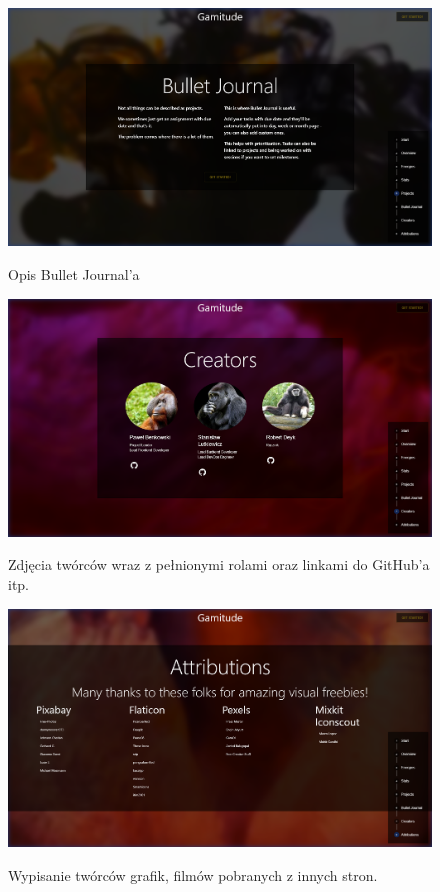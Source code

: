 \documentclass[a4paper,11pt]{report}
\begin{document}
\begin{figure}[H]
	\centering
	\includegraphics[scale=0.3]{prezentacja/Homepage_Bullet}\\
	\caption{Opis Bullet Journal'a}
	\label{fig:homepage_bullet}
\end{figure}
\begin{figure}[H]
	\centering
	\includegraphics[scale=0.3]{prezentacja/Homepage_Creators}\\
	\caption{Zdjęcia twórców wraz z pełnionymi rolami oraz linkami do GitHub'a itp.}
	\label{fig:homepage_creators}
\end{figure}
\begin{figure}[H]
	\centering
	\includegraphics[scale=0.3]{prezentacja/Homepage_Attributions}\\
	\caption{Wypisanie twórców grafik, filmów pobranych z innych stron.}
	\label{fig:homepage_attributions}
\end{figure}
\end{document}

